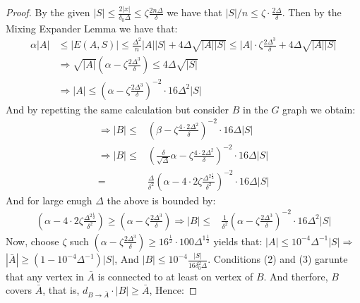  \begin{proof}
   By the given $|S| \le \frac{2|x|}{\delta_{0}\Delta} \le \zeta\frac{2n\Delta}{\delta}$ we have that $|S|/n \le \zeta\cdot \frac{2\Delta}{\delta}$.
   Then by the Mixing Expander Lemma we have that:   
   \begin{equation*}
     \begin{split}
       \alpha |A| & \le |E(A,S)| \le \frac{\Delta^{2}}{n}|A||S| + 4 \Delta \sqrt{|A||S|} \le |A| \cdot \zeta \frac{2\Delta^{3}}{\delta} +  4 \Delta \sqrt{|A||S|}\\ 
       & \Rightarrow \sqrt{|A|}\left(\alpha-\zeta \frac{2\Delta^{3}}{\delta}  \right) \le 4\Delta\sqrt{|S|} \\
       & \Rightarrow |A| \le \left( \alpha -  \zeta \frac{2\Delta^{3}}{\delta}  \right)^{-2} \cdot 16\Delta^{2}|S|
     \end{split}
   \end{equation*}
   And by repetting the same calculation but consider $B$ in the $G$ graph we obtain: 
\begin{equation*}
     \begin{split}
       \Rightarrow  |B| \le & \left( \beta -  \zeta \frac{4 \cdot 2\Delta^{2} }{\delta}  \right)^{-2} \cdot 16\Delta|S|\\
       \Rightarrow  |B| \le & \left( \frac{\delta}{\sqrt{\Delta}}\alpha   -  \zeta \frac{4 \cdot 2\Delta^{2} }{\delta}  \right)^{-2} \cdot 16\Delta|S|\\
       = & \frac{\Delta}{\delta^{2}} \left(  \alpha -  4\cdot 2\zeta \frac{\Delta^{2\frac{1}{2}}}{\delta^{2}}   \right)^{-2} \cdot 16\Delta|S| 
     \end{split}
   \end{equation*}
   And for large enugh $\Delta$ the above is bounded by:
   \begin{equation*}
     \begin{split}
     \left(  \alpha -  4\cdot 2\zeta \frac{\Delta^{2\frac{1}{2}}}{\delta^{2}}   \right) \ge \left( \alpha -  \zeta \frac{2\Delta^{3}}{\delta}  \right) \Rightarrow |B|  \le  & \frac{1}{\delta^{2}} \left( \alpha -  \zeta \frac{2\Delta^{3}}{\delta}  \right)^{-2} \cdot 16\Delta^{2}|S| 
     \end{split}
   \end{equation*}
   Now, choose $\zeta$ such $\left( \alpha -  \zeta \frac{2\Delta^{3}}{\delta}  \right) \ge 16^{\frac{1}{2}} \cdot 100 \Delta^{1\frac{1}{2}}$ yields that: $|A| \le 10^{-4}\Delta^{-1} |S| \Rightarrow $$ |\bar{A}| \ge \left( 1 - 10^{-4} \Delta^{-1}\right)|S|$, And $|B| \le 10^{-4} \frac{|S|}{16 \delta^{2}_{0}\Delta}$. Conditions (2) and (3) garunte that any vertex in $\bar{A}$ is connected to at least on vertex of $B$. And therfore, $B$ covers $\bar{A}$, that is, $ d_{B\rightarrow\bar{A}}\cdot |B| \ge \bar{A}$, Hence:


\end{proof}
